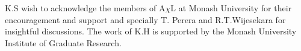 K.S wish to acknowledge the members of A$\chi$L at Monash University for their encouragement and support and specially T. Perera and R.T.Wijesekara for insightful discussions. The work of K.H is supported by the Monash University Institute of Graduate Research.
